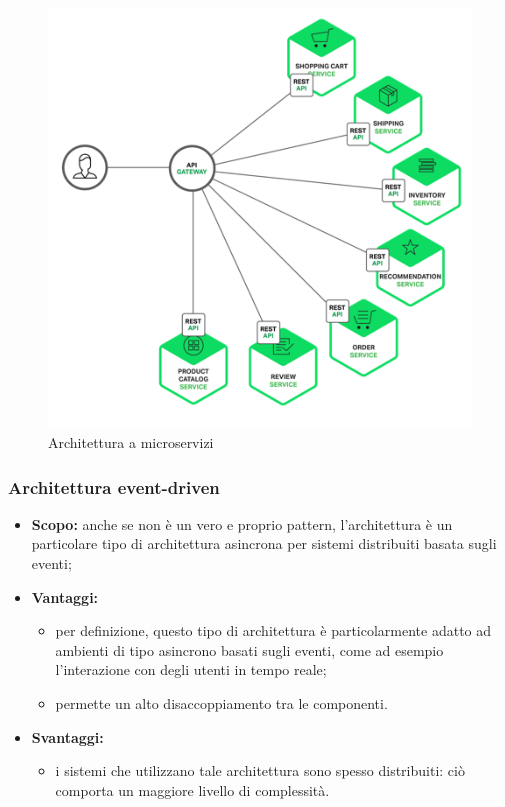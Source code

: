       \begin{figure}[h]
      	\centering
      	\includegraphics[width=\textwidth,height=\textheight,keepaspectratio,scale=0.1]{images/micros.png}
      	\caption{Architettura a microservizi}\label{fig:micr1}
      \end{figure}
      \newpage
    \subsubsection{Architettura event-driven}
      \begin{itemize}
       \item \textbf{Scopo:} anche se non è un vero e proprio pattern, l'architettura  è un particolare tipo di architettura asincrona per sistemi distribuiti basata sugli eventi;
	\item \textbf{Vantaggi:}
	  \begin{itemize}
	   \item per definizione, questo tipo di architettura è particolarmente adatto ad ambienti di tipo asincrono basati sugli eventi, come ad esempio l'interazione con degli utenti in tempo reale;
	   \item permette un alto disaccoppiamento tra le componenti.
	  \end{itemize}
	\item \textbf{Svantaggi:}
	  \begin{itemize}
	   \item i sistemi che utilizzano tale architettura sono spesso distribuiti: ciò comporta un maggiore livello di complessità.
	  \end{itemize}
	\end{itemize}
